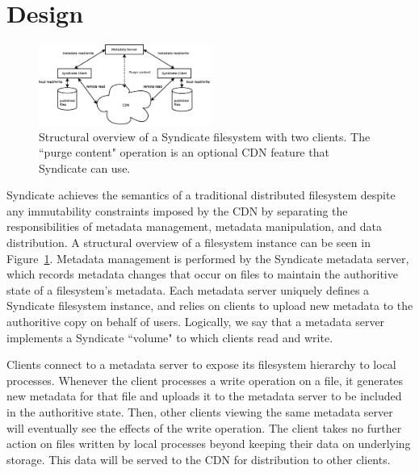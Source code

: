 
\section{Design}

\begin{figure}[h!]
\centering
\includegraphics[width=0.5\textwidth]{figures/overview}
\caption{Structural overview of a Syndicate filesystem with two clients.  The ``purge content" operation is an optional CDN feature that Syndicate can use.}
\label{fig:overview}
\end{figure}


Syndicate achieves the semantics of a traditional distributed filesystem despite any immutability
constraints imposed by the CDN by separating the responsibilities of metadata management, 
metadata manipulation, and data distribution.  
A structural overview of a filesystem instance can be seen in Figure~\ref{fig:overview}.
Metadata management is performed by the Syndicate metadata server, which
records metadata changes that occur on files to maintain the authoritive
state of a filesystem's metadata.  Each metadata server uniquely defines
a Syndicate filesystem instance, and relies on clients to upload new metadata
to the authoritive copy on behalf of users.  Logically, we say that a metadata server
implements a Syndicate ``volume" to which clients read and write.

Clients connect to a metadata server to expose its filesystem hierarchy to local processes.
Whenever the client processes a write operation on a file, it generates new
metadata for that file and uploads it to the metadata server to be included 
in the authoritive state.  Then, other clients viewing the same metadata server
will eventually see the effects of the write operation.
The client takes no further action on files written by local processes 
beyond keeping their data on underlying storage.
This data will be served to the CDN for distribution to other clients.

